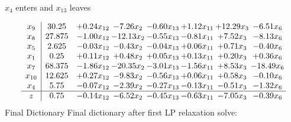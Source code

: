 \documentclass[8pt]{article}
\begin{document}
 $ x_{4} $ enters and $ x_{13} $ leaves 

 \[\begin{array}{c| c c@{\hskip 2pt} c@{\hskip 2pt} c@{\hskip 2pt} c@{\hskip 2pt} c@{\hskip 2pt} c@{\hskip 2pt} }
 x_{9}   &  30.25 & +  0.24 x_{12} & -7.26 x_{2} & -0.60 x_{13} & +  1.12 x_{11} & + 12.29 x_{3} & -6.51 x_{6}\\
 x_{8}   &  27.875 & -1.00 x_{12} & -12.13 x_{2} & -0.55 x_{13} & -0.81 x_{11} & +  7.52 x_{3} & -8.13 x_{6}\\
 x_{5}   &  2.625 & -0.03 x_{12} & -0.43 x_{2} & -0.04 x_{13} & +  0.06 x_{11} & +  0.71 x_{3} & -0.40 x_{6}\\
 x_{1}   &  0.25 & +  0.11 x_{12} & +  0.48 x_{2} & +  0.05 x_{13} & +  0.13 x_{11} & +  0.20 x_{3} & +  0.36 x_{6}\\
 x_{7}   &  68.375 & -1.86 x_{12} & -20.35 x_{2} & -3.01 x_{13} & -1.56 x_{11} & +  8.53 x_{3} & -18.49 x_{6}\\
 x_{10}   &  12.625 & +  0.27 x_{12} & -9.83 x_{2} & -0.56 x_{13} & +  0.06 x_{11} & +  0.58 x_{3} & -0.10 x_{6}\\
 x_{4}   &  5.75 & -0.07 x_{12} & -2.39 x_{2} & -0.27 x_{13} & -0.13 x_{11} & -0.51 x_{3} & -1.32 x_{6}\\
\hline
z    &  0.75 & -0.14 x_{12} & -6.52 x_{2} & -0.45 x_{13} & -0.63 x_{11} & -7.05 x_{3} & -0.39 x_{6}\\
\end{array}\]
Final Dictionary
Final dictionary after first LP relaxation solve: 
\end{document}
